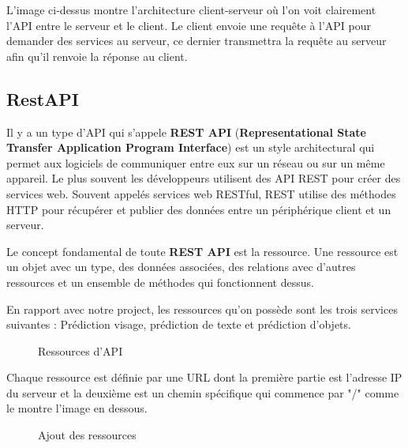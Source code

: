 {L'image ci-dessus montre l'architecture client-serveur où l'on voit clairement l'API entre le serveur et le client. Le client envoie une requête à l'API pour demander des services au serveur, ce dernier transmettra la requête au serveur afin qu'il renvoie la réponse au client.

    \subsection{RestAPI}
Il y a un type d'API qui s'appele \textbf{REST API} (\textbf{Representational State Transfer Application Program Interface}) est un style architectural qui permet aux logiciels de communiquer entre eux sur un réseau ou sur un même appareil. Le plus souvent les développeurs utilisent des API REST pour créer des services web. Souvent appelés services web RESTful, REST utilise des méthodes HTTP pour récupérer et publier des données entre un périphérique client et un serveur.

Le concept fondamental de toute \textbf{REST API} est la ressource. Une ressource est un objet avec un type, des données associées, des relations avec d'autres ressources et un ensemble de méthodes qui fonctionnent dessus.

En rapport avec notre project, les ressources qu'on possède sont les trois services suivantes : Prédiction visage, prédiction de texte et prédiction d'objets.\\[0.5cm]

\begin{figure}[h] 
\centering
{}
\caption{Ressources d'API}
\label{fig:figure2}
\end{figure}
Chaque ressource est définie par une URL dont la première partie est l'adresse IP du serveur et la deuxième est un chemin spécifique qui commence par "/" comme le montre l'image en dessous.

\begin{figure}[h] 
\centering
{}
\caption{Ajout des ressources}
\label{fig:figure2}
\end{figure}

}
